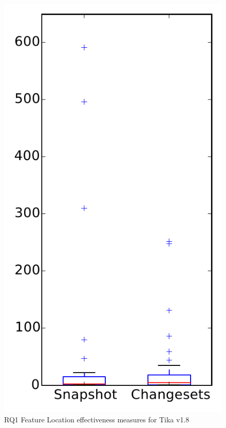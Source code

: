 
\begin{figure}
\centering
\includegraphics[height=0.4\textheight]{figures/flt/rq1_tika}
\caption{RQ1 Feature Location effectiveness measures for Tika v1.8}
\label{fig:flt:rq1:tika}
\end{figure}
